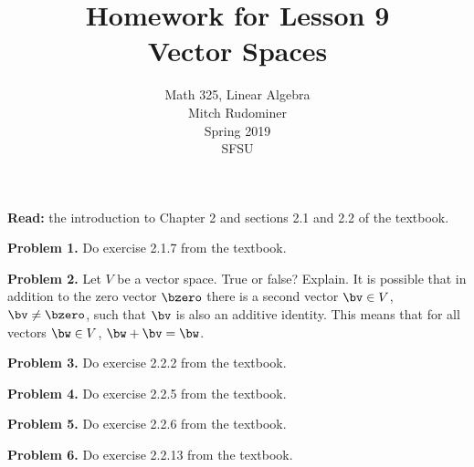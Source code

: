 \documentclass[oneside,12pt]{amsart}
\begin{document}
\title{Homework for Lesson 9 \\ Vector Spaces}
\author{Math 325, Linear Algebra \\ Mitch Rudominer \\ Spring 2019 \\ SFSU }
\date{}

\maketitle

\textbf{Read:} the introduction to Chapter 2 and sections 2.1 and 2.2 of the textbook.

\bigskip

\textbf{Problem 1.} Do exercise 2.1.7 from the textbook.

\bigskip
\bigskip
\bigskip
\bigskip
\bigskip
\bigskip
\bigskip
\bigskip

\textbf{Problem 2.} Let $V$ be a vector space. True or false? Explain. It is possible
that in addition to the zero vector $\bzero$ there is a second vector $\bv\in V$,
$\bv\not=\bzero$,
such that $\bv$ is also an additive identity. This means that for all
vectors $\bw\in V$, $\bw + \bv = \bw$.

\bigskip
\bigskip
\bigskip
\bigskip
\bigskip

\textbf{Problem 3.} Do exercise 2.2.2 from the textbook.

\bigskip
\bigskip
\bigskip
\bigskip
\bigskip
\bigskip
\bigskip
\bigskip
\bigskip
\bigskip

\textbf{Problem 4.} Do exercise 2.2.5 from the textbook.

\bigskip
\bigskip
\bigskip

\textbf{Problem 5.} Do exercise 2.2.6 from the textbook.

\bigskip
\bigskip
\bigskip
\bigskip
\bigskip
\bigskip
\bigskip

\textbf{Problem 6.} Do exercise 2.2.13 from the textbook.

\bigskip
\bigskip
\bigskip
\bigskip
\bigskip
\bigskip
\bigskip
\end{document}
